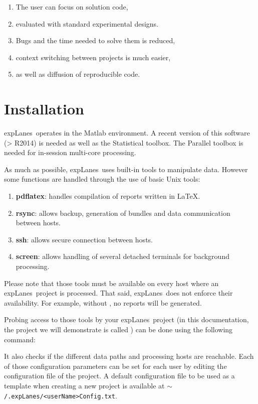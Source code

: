 \documentclass[a4paper,fleqn]{tufte-handout}
\newcommand{\explanes}{\textsf{expLanes}\ }
\begin{document}
\begin{enumerate}
\item The user can focus on solution code,
\item evaluated with standard experimental designs.
\item Bugs and the time needed to solve them is reduced,
\item context switching between projects is much easier,
\item as well as diffusion of reproducible code.
\end{enumerate}

\section{Installation}
\hypertarget{installation}{} 

\explanes operates in the Matlab environment. A recent version of this software (> R2014) is needed as well as the Statistical toolbox. The Parallel toolbox is needed for in-session multi-core processing. 

As much as possible, \explanes uses built-in tools to manipulate data. However some functions are handled through the use of basic Unix tools:
\begin{enumerate}
\item \textbf{pdflatex}: handles compilation of reports written in \LaTeX.
\item \textbf{rsync}: allows backup, generation of bundles and data communication between hosts.
\item \textbf{ssh}: allows secure connection between hosts.
\item \textbf{screen}: allows handling of several detached terminals for background processing.
\end{enumerate}

Please note that those tools must be available on every host where an \explanes project is processed. That said, \explanes does not enforce their availability. For example, without , no reports will be generated.

Probing access to those tools by your \explanes project (in this documentation, the project we will demonstrate is called ) can be done using the following command:


It also checks if the different data paths and processing hosts are reachable. Each of those configuration parameters can be set for each user by editing the configuration file of the project. A default configuration file to be used as a template when creating a new project is available at \texttt{$\sim$/.expLanes/<userName>Config.txt}.
\end{document}
